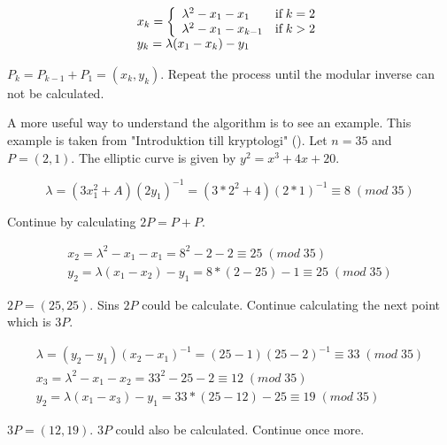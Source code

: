 \begin{equation*}
    \begin{array}{l}
        x_k =  \left\{\begin{array}{l l}
        \lambda^2 - x_1 - x_1 & \text{if}\; k = 2\\
        \lambda^2 - x_1 - x_{k-1} & \text{if}\; k > 2
        \end{array}\right.\\
        y_k = \lambda(x_1 - x_k) - y_1
    \end{array}
\end{equation*}

$P_k = P_{k-1} + P_1 = (x_k,y_k)$. Repeat the process until the modular inverse can not be calculated.

A more useful way to understand the algorithm is to see an example. This example is taken from "Introduktion till kryptologi" (\cite{Cryptography101}).
Let $n = 35$ and $P = (2,1)$. The elliptic curve is given by $y^2 = x^3 + 4x + 20$.

\begin{equation*}
    \lambda = (3x_1^2 + A)(2y_1)^{-1} = (3*2^2+4)(2*1)^{-1} \equiv 8 \;(mod\;35)
\end{equation*}

Continue by calculating $2P = P + P$.

\begin{equation*}
    \begin{array}{l}
        x_2 = \lambda^2 - x_1 - x_1 = 8^2 - 2 - 2 \equiv 25\;(mod\;35) \\
        y_2 = \lambda(x_1 - x_2) - y_1 = 8*(2-25) - 1 \equiv 25\; (mod\;35)
    \end{array}
\end{equation*}

$2P = (25, 25)$. Sins $2P$ could be calculate. Continue calculating the next point which is $3P$.

\begin{equation*}
    \begin{array}{l}
        \lambda = (y_2 - y_1)(x_2 - x_1)^{-1} = (25-1)(25-2)^{-1} \equiv 33 \; (mod\;35) \\
        x_3 = \lambda^2 - x_1 - x_2 = 33^2 - 25 - 2 \equiv 12 \; (mod\;35)\\
        y_2 = \lambda(x_1 - x_3) - y_1 = 33*(25-12)-25 \equiv 19 \; (mod\;35)
    \end{array}
\end{equation*}

$3P = (12, 19)$. $3P$ could also be calculated. Continue once more.

